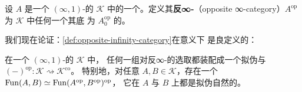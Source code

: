 \begin{definition}\label{def:opposite-infinity-category}
设 $A$ 是一个 $(\infty,1)$-\trCategory{}的\trInfinityCosmos{} $\mathcal{K}$
中的一个\trInfinityCategory。定义其\textbf{反∞-\trCategory}（opposite
∞-category）$A^{\mathrm{op}}$ 为 $\mathcal{K}$ 中任何一个其底\trQuasiCategory{}%
为 $A_{0}^{\mathrm{op}}$ 的\trInfinityCategory。
\end{definition}

我们现在论证：\cref{def:opposite-infinity-category}在\trEquivalence{}意义下
是良定义的：

\begin{proposition}\label{prop:opposite-quasi-pseudofunctor}
在一个 $(\infty,1)$-\trCategory{}的\trInfinityCosmos{} $\mathcal{K}$ 中，
任何一组对反∞-\trCategory{}的选取都装配成一个拟伪\trFunctor{}与%
\trBiequivalence{} $(-)^{\mathrm{op}}\colon\mathcal{K}\rightsquigarrow\mathcal{K}^{\mathrm{co}}$。
特别地，对任意\trInfinityCategory{} $A,B\in\mathcal{K}$，存在一个%
\trEquivalence{} $\operatorname{Fun}(A,B)\simeq\operatorname{Fun}(A^{\mathrm{op}},B^{\mathrm{op}})^{\mathrm{op}}$，
它在 $A$ 与 $B$ 上都是拟伪自然的。
\end{proposition}

